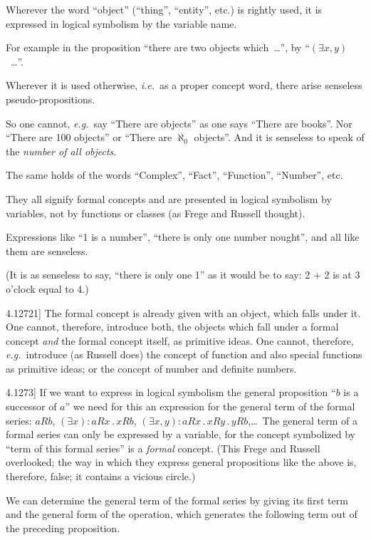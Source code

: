 \documentclass[12pt,oneside]{book}[2007/10/19]
\newcommand{\PropositionE}[2]{%
  \item[\phantomsection\label{PropE:#1}\PropGRef{#1}] #2%
}
\newcommand{\PropGRef}[1]{\hyperref[PropG:#1]{#1}}
\newcommand{\DotOp}{\mathbin{.}}
\newcommand{\idEst}{\textit{i.e.}}
\newcommand{\exempliGratia}{\textit{e.g.}}
\begin{document}
\begin{propositions}
{Wherever the word ``object'' (``thing'', ``entity'',
etc.) is rightly used, it is expressed in logical
symbolism by the variable name.

For example in the proposition ``there are two
objects which\ \ldots'', by ``$(\exists x,y)$\ \ldots''.

Wherever it is used otherwise, \idEst\ as a proper
concept word, there arise senseless pseudo-propositions.

So one cannot, \exempliGratia\ say ``There are objects''
as one says ``There are books''. Nor ``There
are 100 objects'' or ``There are $\aleph_0$ objects''. And
it is senseless to speak of the \emph{number of all
objects}.

The same holds of the words ``Complex'',
``Fact'', ``Function'', ``Number'', etc.

They all signify formal concepts and are
presented in logical symbolism by variables, not
by functions or classes (as Frege and Russell
thought).

Expressions like ``1 is a number'', ``there is
only one number nought'', and all like them are
senseless.

(It is as senseless to say, ``there is only one 1''
as it would be to say: 2 + 2 is at 3 o'clock equal
to 4.)}


\PropositionE{4.12721}
{The formal concept is already given with an
object, which falls under it. One cannot, therefore,
introduce both, the objects which fall under
a formal concept \emph{and} the formal concept itself,
as primitive ideas. One cannot, therefore, \exempliGratia\ introduce
(as Russell does) the concept of function
and also special functions as primitive ideas; or
the concept of number and definite numbers.}


\PropositionE{4.1273}
{If we want to express in logical symbolism
the general proposition ``$b$ is a successor of $a$''
we need for this an expression for the general
term of the formal series: $aRb$, $(\exists x) : aRx \DotOp xRb$,
$(\exists x,y) : aRx \DotOp xRy \DotOp yRb$,\;\ldots\ The general term of
a formal series can only be expressed by a
variable, for the concept symbolized by ``term of
this formal series'' is a \emph{formal} concept. (This
Frege and Russell overlooked; the way in
which they express general propositions like the
above is, therefore, false; it contains a vicious
circle.)

We can determine the general term of the
formal series by giving its first term and the
general form of the operation, which generates
the following term out of the preceding proposition.}



\end{propositions}
\end{document}
